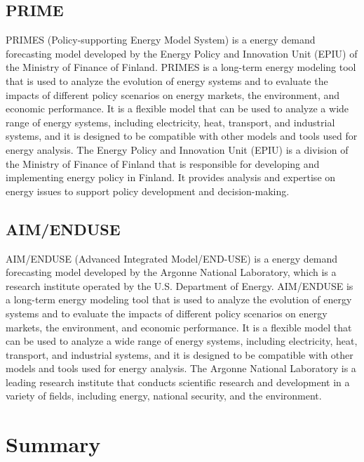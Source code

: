 \documentclass[lettersize,journal]{IEEEtran}
\begin{document}
  \subsection{PRIME}
  PRIMES (Policy-supporting Energy Model System) is a energy demand forecasting model developed by the Energy Policy and Innovation Unit (EPIU) of the Ministry of Finance of Finland. PRIMES is a long-term energy modeling tool that is used to analyze the evolution of energy systems and to evaluate the impacts of different policy scenarios on energy markets, the environment, and economic performance. It is a flexible model that can be used to analyze a wide range of energy systems, including electricity, heat, transport, and industrial systems, and it is designed to be compatible with other models and tools used for energy analysis. The Energy Policy and Innovation Unit (EPIU) is a division of the Ministry of Finance of Finland that is responsible for developing and implementing energy policy in Finland. It provides analysis and expertise on energy issues to support policy development and decision-making.


  \subsection{AIM/ENDUSE}
  AIM/ENDUSE (Advanced Integrated Model/END-USE) is a energy demand forecasting model developed by the Argonne National Laboratory, which is a research institute operated by the U.S. Department of Energy. AIM/ENDUSE is a long-term energy modeling tool that is used to analyze the evolution of energy systems and to evaluate the impacts of different policy scenarios on energy markets, the environment, and economic performance. It is a flexible model that can be used to analyze a wide range of energy systems, including electricity, heat, transport, and industrial systems, and it is designed to be compatible with other models and tools used for energy analysis. The Argonne National Laboratory is a leading research institute that conducts scientific research and development in a variety of fields, including energy, national security, and the environment.



\section{Summary}
\end{document}
